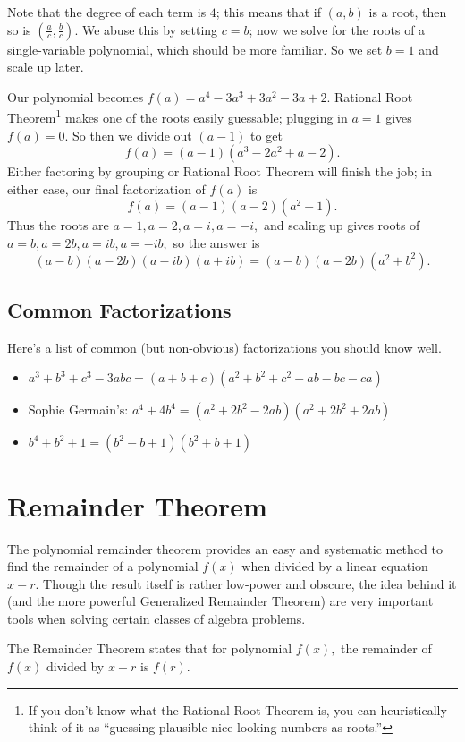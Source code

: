 \documentclass[mast]{lucky}
\begin{document}
\begin{sol}[2]
Note that the degree of each term is $4$; this means that if $(a,b)$ is a root, then so is $(\frac{a}{c},\frac{b}{c}).$ We abuse this by setting $c=b$; now we solve for the roots of a single-variable polynomial, which should be more familiar. So we set $b=1$ and scale up later.

Our polynomial becomes $f(a)=a^4-3a^3+3a^2-3a+2.$ Rational Root Theorem\footnote{If you don't know what the Rational Root Theorem is, you can heuristically think of it as ``guessing plausible nice-looking numbers as roots.''} makes one of the roots easily guessable; plugging in $a=1$ gives $f(a)=0.$ So then we divide out $(a-1)$ to get
\[f(a)=(a-1)(a^3-2a^2+a-2).\]
Either factoring by grouping or Rational Root Theorem will finish the job; in either case, our final factorization of $f(a)$ is
\[f(a)=(a-1)(a-2)(a^2+1).\]
Thus the roots are $a=1,a=2,a=i,a=-i,$ and scaling up gives roots of $a=b,a=2b,a=ib,a=-ib,$ so the answer is
\[(a-b)(a-2b)(a-ib)(a+ib)=(a-b)(a-2b)(a^2+b^2).\]
\end{sol}

\subsection{Common Factorizations}
Here's a list of common (but non-obvious) factorizations you should know well.
\begin{fact}\hfill
\begin{itemize}
     \item $a^3+b^3+c^3-3abc=(a+b+c)(a^2+b^2+c^2-ab-bc-ca)$
     \item Sophie Germain's: $a^4+4b^4=(a^2+2b^2-2ab)(a^2+2b^2+2ab)$
     \item $b^4+b^2+1=(b^2-b+1)(b^2+b+1)$
\end{itemize}
\end{fact}

\section{Remainder Theorem}
The polynomial remainder theorem provides an easy and systematic method to find the remainder of a polynomial $f(x)$ when divided by a linear equation $x-r.$ Though the result itself is rather low-power and obscure, the idea behind it (and the more powerful Generalized Remainder Theorem) are very important tools when solving certain classes of algebra problems.
\begin{theo}
The Remainder Theorem states that for polynomial $f(x),$ the remainder of $f(x)$ divided by $x-r$ is $f(r).$
\end{theo}
\end{document}
